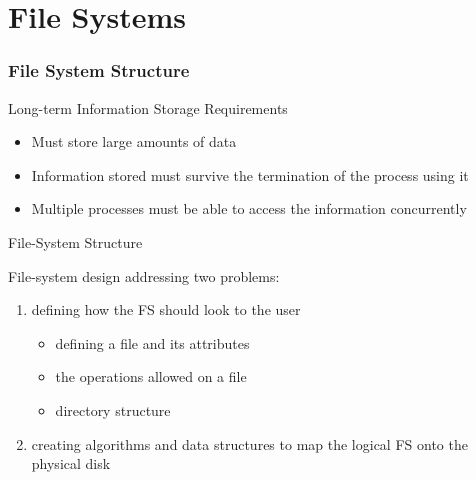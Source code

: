 \mode*
\part{File Systems}


\section{File System Structure}

\begin{frame}{Long-term Information Storage Requirements}
  \begin{itemize}
  \item Must store large amounts of data
  \item Information stored must survive the termination of the process using it
  \item Multiple processes must be able to access the information concurrently
  \end{itemize}
\end{frame}

\begin{frame}{File-System Structure}
  \begin{block}{File-system design addressing two problems:}
    \begin{enumerate}
    \item defining how the FS should look to the user
      \begin{itemize}
      \item defining a file and its attributes
      \item the operations allowed on a file
      \item directory structure
      \end{itemize}
    \item creating algorithms and data structures to map the logical FS onto the
      physical disk
    \end{enumerate}
  \end{block}
\end{frame}

